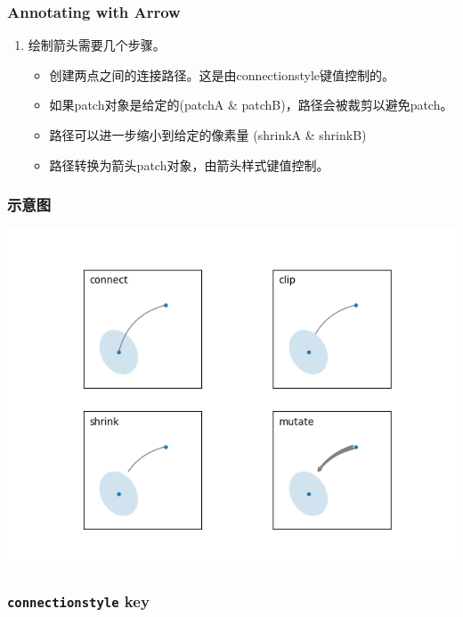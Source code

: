 \documentclass[UTF8,a4paper,12pt]{ctexart}  %
\providecommand{\tightlist}{\setlength{\itemsep}{0pt}\setlength{\parskip}{0pt}}
\begin{document}
\hypertarget{annotating-with-arrow}{%
\subsubsection{Annotating with Arrow}\label{annotating-with-arrow}}

\begin{enumerate}
\def\labelenumi{\arabic{enumi}.}
\tightlist
\item
  绘制箭头需要几个步骤。

  \begin{itemize}
  \tightlist
  \item
    创建两点之间的连接路径。这是由connectionstyle键值控制的。
  \item
    如果patch对象是给定的(patchA \& patchB)，路径会被裁剪以避免patch。
  \item
    路径可以进一步缩小到给定的像素量 (shrinkA \&
    shrinkB)
  \item
    路径转换为箭头patch对象，由箭头样式键值控制。
  \end{itemize}
\end{enumerate}

\hypertarget{ux793aux610fux56fe}{%
\subsubsection{示意图}\label{ux793aux610fux56fe}}

\includegraphics{images/annotate_explain.png}

\hypertarget{connectionstyle-key}{%
\subsubsection{\texorpdfstring{\texttt{connectionstyle} key}{connectionstyle key}}\label{connectionstyle-key}}
\end{document}
